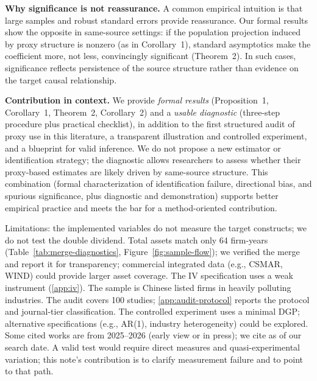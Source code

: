\textbf{Why significance is not reassurance.} A common empirical intuition is that large samples and robust standard errors provide reassurance. Our formal results show the opposite in same-source settings: if the population projection induced by proxy structure is nonzero (as in Corollary~1), standard asymptotics make the coefficient more, not less, convincingly significant (Theorem~2). In such cases, significance reflects persistence of the source structure rather than evidence on the target causal relationship.

\textbf{Contribution in context.} We provide \emph{formal results} (Proposition~1, Corollary~1, Theorem~2, Corollary~2) and a \emph{usable diagnostic} (three-step procedure plus practical checklist), in addition to the first structured audit of proxy use in this literature, a transparent illustration and controlled experiment, and a blueprint for valid inference. We do not propose a new estimator or identification strategy; the diagnostic allows researchers to assess whether their proxy-based estimates are likely driven by same-source structure. This combination (formal characterization of identification failure, directional bias, and spurious significance, plus diagnostic and demonstration) supports better empirical practice and meets the bar for a method-oriented contribution.

Limitations: the implemented variables do not measure the target constructs; we do not test the double dividend. Total assets match only 64 firm-years (Table~\ref{tab:merge-diagnostics}, Figure~\ref{fig:sample-flow}); we verified the merge and report it for transparency; commercial integrated data (e.g., CSMAR, WIND) could provide larger asset coverage. The IV specification uses a weak instrument (\ref{app:iv}). The sample is Chinese listed firms in heavily polluting industries. The audit covers 100 studies; \ref{app:audit-protocol} reports the protocol and journal-tier classification. The controlled experiment uses a minimal DGP; alternative specifications (e.g., AR(1), industry heterogeneity) could be explored. Some cited works are from 2025--2026 (early view or in press); we cite as of our search date. A valid test would require direct measures and quasi-experimental variation; this note's contribution is to clarify measurement failure and to point to that path.
